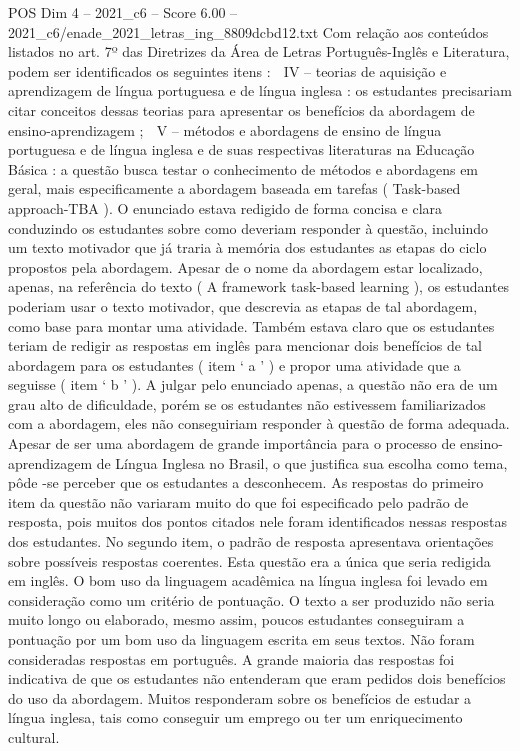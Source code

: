 \begin{textsample}{POS Dim 4 – 2021\_c6 – Score 6.00 – 2021\_c6/enade\_2021\_letras\_ing\_8809dcbd12.txt}
Com relação aos conteúdos listados no art. 7º das Diretrizes da Área de Letras Português-Inglês e Literatura, podem ser identificados os seguintes itens :  IV – teorias de aquisição e aprendizagem de língua portuguesa e de língua inglesa : os estudantes precisariam citar conceitos dessas teorias para apresentar os benefícios da abordagem de ensino-aprendizagem ;  V – métodos e abordagens de ensino de língua portuguesa e de língua inglesa e de suas respectivas literaturas na Educação Básica : a questão busca testar o conhecimento de métodos e abordagens em geral, mais especificamente a abordagem baseada em tarefas ( Task-based approach-TBA ).
O enunciado estava redigido de forma concisa e clara conduzindo os estudantes sobre como deveriam responder à questão, incluindo um texto motivador que já traria à memória dos estudantes as etapas do ciclo propostos pela abordagem.
Apesar de o nome da abordagem estar localizado, apenas, na referência do texto ( A framework task-based learning ), os estudantes poderiam usar o texto motivador, que descrevia as etapas de tal abordagem, como base para montar uma atividade.
Também estava claro que os estudantes teriam de redigir as respostas em inglês para mencionar dois benefícios de tal abordagem para os estudantes ( item ‘ a ’ ) e propor uma atividade que a seguisse ( item ‘ b ’ ).
A julgar pelo enunciado apenas, a questão não era de um grau alto de dificuldade, porém se os estudantes não estivessem familiarizados com a abordagem, eles não conseguiriam responder à questão de forma adequada.
Apesar de ser uma abordagem de grande importância para o processo de ensino-aprendizagem de Língua Inglesa no Brasil, o que justifica sua escolha como tema, pôde -se perceber que os estudantes a desconhecem.
As respostas do primeiro item da questão não variaram muito do que foi especificado pelo padrão de resposta, pois muitos dos pontos citados nele foram identificados nessas respostas dos estudantes.
No segundo item, o padrão de resposta apresentava orientações sobre possíveis respostas coerentes.
Esta questão era a única que seria redigida em inglês.
O bom uso da linguagem acadêmica na língua inglesa foi levado em consideração como um critério de pontuação.
O texto a ser produzido não seria muito longo ou elaborado, mesmo assim, poucos estudantes conseguiram a pontuação por um bom uso da linguagem escrita em seus textos.
Não foram consideradas respostas em português.
A grande maioria das respostas foi indicativa de que os estudantes não entenderam que eram pedidos dois benefícios do uso da abordagem.
Muitos responderam sobre os benefícios de estudar a língua inglesa, tais como conseguir um emprego ou ter um enriquecimento cultural.

\end{textsample}
